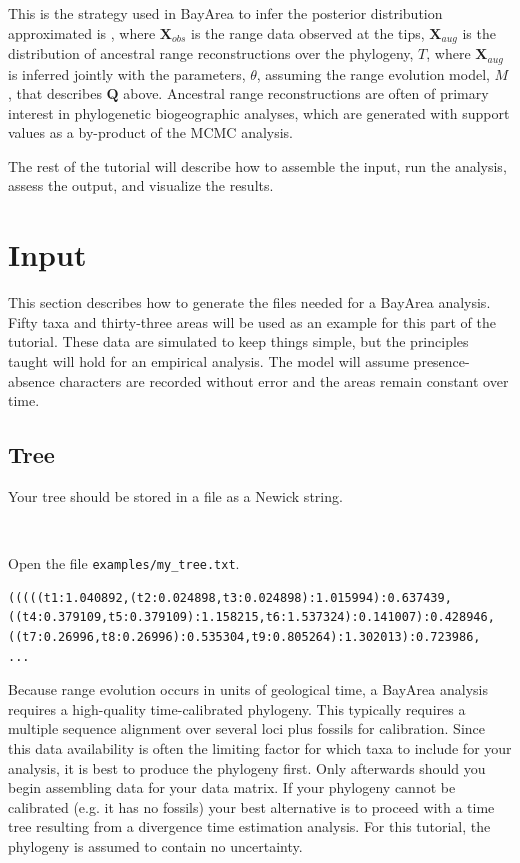 \documentclass[11pt]{article}
\newcommand{\impmark}{\strut\vadjust{\domark}}
\newcommand{\domark}{%
  \vbox to 0pt{
    \kern-\dp\strutbox
    \smash{\llap{$\rightarrow$\kern1em}}
    \vss
  }%
}
\begin{document}
This is the strategy used in BayArea to infer the posterior distribution approximated is 
, where $\textbf{X}_{obs}$ is the range data observed at the tips, $\textbf{X}_{aug}$ is the distribution of ancestral range reconstructions over the phylogeny, $T$, where $\textbf{X}_{aug}$ is inferred jointly with the parameters, $\theta$, assuming the range evolution model, $M$, that describes $\textbf{Q}$ above.
Ancestral range reconstructions are often of primary interest in phylogenetic biogeographic analyses, which are generated with support values as a by-product of the MCMC analysis.

The rest of the tutorial will describe how to assemble the input, run the analysis, assess the output, and visualize the results.

\section{Input}

This section describes how to generate the files needed for a BayArea analysis.
Fifty taxa and thirty-three areas will be used as an example for this part of the tutorial.
These data are simulated to keep things simple, but the principles taught will hold for an empirical analysis.
The model will assume presence-absence characters are recorded without error and the areas remain constant over time.

\subsection{Tree}

Your tree should be stored in a file as a Newick string.

\noindent \\ \impmark Open the file \texttt{examples/my\_tree.txt}.

\begin{framed}
\begin{lstlisting}
(((((t1:1.040892,(t2:0.024898,t3:0.024898):1.015994):0.637439,((t4:0.379109,t5:0.379109):1.158215,t6:1.537324):0.141007):0.428946,((t7:0.26996,t8:0.26996):0.535304,t9:0.805264):1.302013):0.723986,
...
\end{lstlisting}
\end{framed}

Because range evolution occurs in units of geological time, a BayArea analysis requires a high-quality time-calibrated phylogeny. This typically requires a multiple sequence alignment over several loci plus fossils for calibration.
Since this data availability is often the limiting factor for which taxa to include for your analysis, it is best to produce the phylogeny first.
Only afterwards should you begin assembling data for your data matrix.
If your phylogeny cannot be calibrated (e.g. it has no fossils) your best alternative is to proceed with a time tree resulting from a divergence time estimation analysis.
For this tutorial, the phylogeny is assumed to contain no uncertainty.
\end{document}
